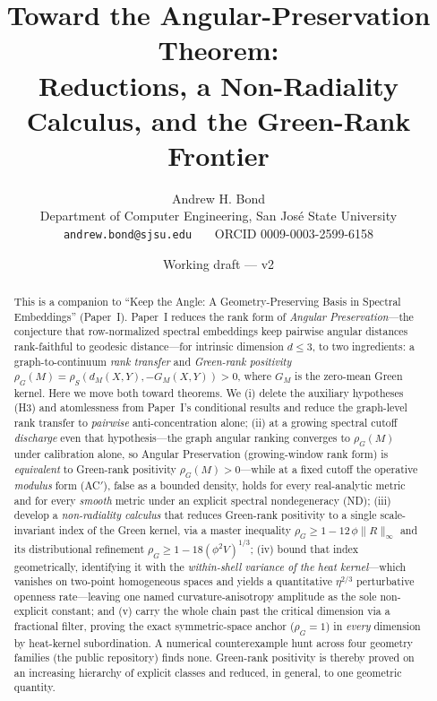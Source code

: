 \documentclass[11pt]{article}
\title{Toward the Angular-Preservation Theorem:\\
Reductions, a Non-Radiality Calculus, and the Green-Rank Frontier}
\author{Andrew H. Bond\\
\small Department of Computer Engineering, San Jos\'e State University\\
\small \texttt{andrew.bond@sjsu.edu} \ \textbullet\ \ ORCID 0009-0003-2599-6158}
\date{Working draft --- v2}
\theoremstyle{remark}
\begin{document}
\maketitle

\begin{abstract}
This is a companion to ``Keep the Angle: A Geometry-Preserving Basis in Spectral
Embeddings'' (Paper~I). Paper~I reduces the rank form of \emph{Angular Preservation}---the
conjecture that row-normalized spectral embeddings keep pairwise angular distances
rank-faithful to geodesic distance---for intrinsic dimension $d\le3$, to two ingredients: a
graph-to-continuum \emph{rank transfer} and \emph{Green-rank positivity}
$\rho_G(M)=\rho_S(d_M(X,Y),-G_M(X,Y))>0$, where $G_M$ is the zero-mean Green kernel. Here we
move both toward theorems. We (i) delete the auxiliary hypotheses (H3) and atomlessness from
Paper~I's conditional results and reduce the graph-level rank transfer to \emph{pairwise}
anti-concentration alone; (ii) at a growing spectral cutoff \emph{discharge} even that
hypothesis---the graph angular ranking converges to $\rho_G(M)$ under calibration alone, so
Angular Preservation (growing-window rank form) is \emph{equivalent} to Green-rank positivity
$\rho_G(M)>0$---while at a fixed cutoff the operative \emph{modulus} form (AC$'$), false as a
bounded density, holds for every real-analytic metric and for every \emph{smooth} metric under
an explicit spectral nondegeneracy (ND); (iii) develop a \emph{non-radiality calculus} that reduces Green-rank
positivity to a single scale-invariant index of the Green kernel, via a master inequality
$\rho_G\ge1-12\,\phi\lVert R\rVert_\infty$ and its distributional refinement
$\rho_G\ge1-18(\phi^2V)^{1/3}$; (iv) bound that index geometrically, identifying it with the
\emph{within-shell variance of the heat kernel}---which vanishes on two-point homogeneous
spaces and yields a quantitative $\eta^{2/3}$ perturbative openness rate---leaving one named
curvature-anisotropy amplitude as the sole non-explicit
constant; and (v) carry the whole chain past the critical dimension via a fractional filter,
proving the exact symmetric-space anchor ($\rho_G=1$) in \emph{every} dimension by heat-kernel
subordination. A numerical counterexample hunt across four geometry families (the public
repository) finds none. Green-rank positivity is thereby proved on an increasing hierarchy of
explicit classes and reduced, in general, to one geometric quantity.


\end{abstract}
\end{document}
